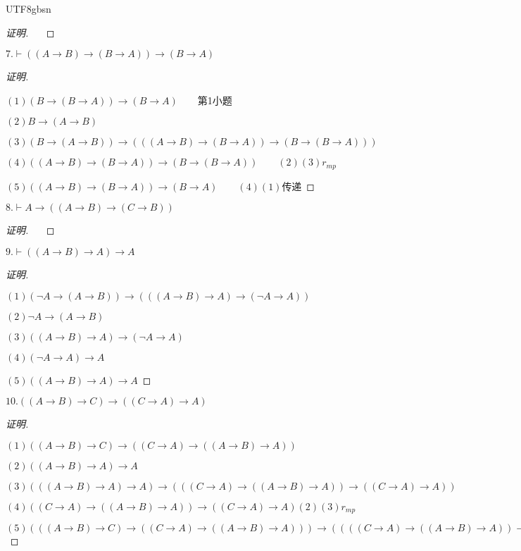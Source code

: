 \documentclass{article}
\begin{document}
\begin{CJK*}{UTF8}{gbsn}
\begin{proof}[证明]$\quad$
  
  

\end{proof}
$7.\vdash ((A\to B)\to (B\to A))\to (B\to A)$

\begin{proof}[证明]$\quad$

$(1)(B\to (B\to A))\to (B\to A)\quad\quad$第1小题

 $(2)B\to (A\to B)$
 
 $(3)(B\to (A\to B))\to (((A\to B)\to(B\to A))\to(B\to (B\to A)))$

$(4)((A\to B)\to(B\to A))\to(B\to (B\to A))\qquad (2)(3)r_{mp}$

$(5)((A\to B)\to (B\to A))\to (B\to A) \qquad (4)(1)\text{传递}$
\end{proof}
$8.\vdash A\to ((A\to B)\to (C\to B))$

\begin{proof}[证明]$\quad$
  
  


\end{proof}
$9.\vdash ((A\to B)\to A)\to A$

\begin{proof}[证明]$\quad$

  $(1) (\lnot A\to (A\to B))\to (((A\to B)\to A)\to (\lnot A\to A))$

  $(2) \lnot A\to (A\to B)$

  $(3) ((A\to B)\to A)\to (\lnot A\to A)$

  $(4) (\lnot A\to A) \to A$

  $(5) ((A\to B)\to A)\to A$

\end{proof}

$10.((A\to B)\to C)\to ((C\to A)\to A)$

\begin{proof}[证明]$\quad$

  $(1)((A\to B)\to C)\to ((C\to A)\to ((A\to B)\to A))$

  $(2)((A\to B)\to A)\to A$

  $(3)(((A\to B)\to A)\to A)\to (((C\to A)\to ((A\to B)\to A))\to ((C\to A)\to A))$

$(4)((C\to A)\to ((A\to B)\to A))\to ((C\to A)\to A)(2)(3)r_{mp}$

$(5)(((A\to B)\to C)\to ((C\to A)\to ((A\to B)\to A)))\to ((((C\to A)\to ((A\to B)\to A))\to ((C\to A)\to A)) \to (((A\to B)\to C)\to ((C\to A)\to A)))$


\end{proof}
\end{CJK*}
\end{document}
